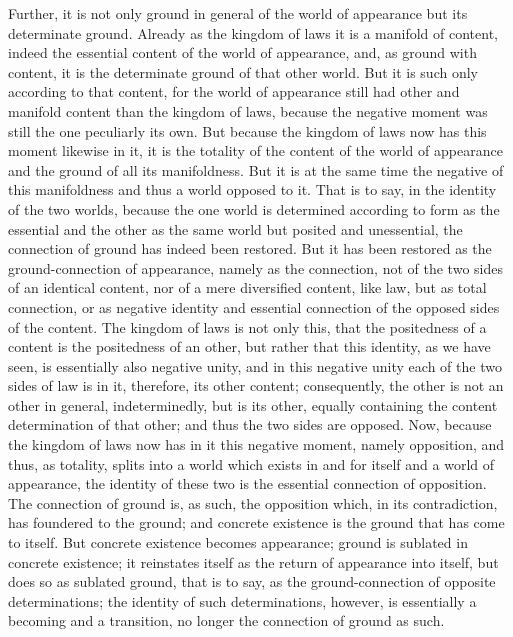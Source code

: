 Further, it is not only ground in general
of the world of appearance but its determinate ground.
Already as the kingdom of laws it is a manifold of content,
indeed the essential content of the world of appearance,
and, as ground with content, it is 
the determinate ground of that other world.
But it is such only according to that content, 
for the world of appearance still had other
and manifold content than the kingdom of laws,
because the negative moment was still the one peculiarly its own.
But because the kingdom of laws now has this moment likewise in it,
it is the totality of the content of the world of appearance
and the ground of all its manifoldness.
But it is at the same time the negative of 
this manifoldness and thus a world opposed to it.
That is to say, in the identity of the two worlds,
because the one world is determined
according to form as the essential
and the other as the same world
but posited and unessential,
the connection of ground has indeed been restored.
But it has been restored as the ground-connection of appearance,
namely as the connection, 
not of the two sides of an identical content,
nor of a mere diversified content, like law,
but as total connection, 
or as negative identity and essential connection
of the opposed sides of the content.
The kingdom of laws is not only this,
that the positedness of a content
is the positedness of an other,
but rather that this identity, as we have seen, 
is essentially also negative unity,
and in this negative unity 
each of the two sides of law is in it,
therefore, its other content;
consequently, the other is not 
an other in general, indeterminedly, 
but is its other, equally containing 
the content determination of that other;
and thus the two sides are opposed.
Now, because the kingdom of laws now has in it
this negative moment, namely opposition,
and thus, as totality, splits into a world 
which exists in and for itself and a world of appearance,
the identity of these two is 
the essential connection of opposition.
The connection of ground is, as such, the opposition
which, in its contradiction, has foundered to the ground;
and concrete existence is the ground that has come to itself.
But concrete existence becomes appearance;
ground is sublated in concrete existence;
it reinstates itself as the return of appearance into itself,
but does so as sublated ground, that is to say,
as the ground-connection of opposite determinations;
the identity of such determinations, however, is
essentially a becoming and a transition,
no longer the connection of ground as such.


